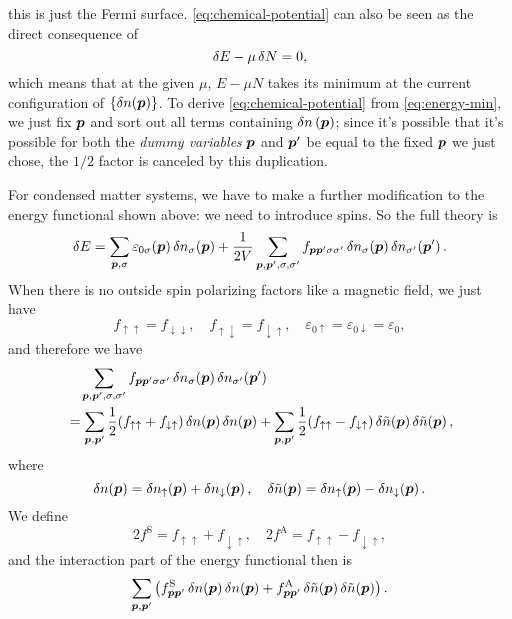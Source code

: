 \documentclass[hyperref, a4paper]{article}
\begin{document}
this is just the Fermi surface. 
\eqref{eq:chemical-potential} can also be seen as the direct consequence of 
\begin{equation}
    \var{E} - \mu \var{N} = 0,
    \label{eq:energy-min}
\end{equation}
which means that at the given $\mu$, 
$E - \mu N$ takes its minimum at the current configuration of $\{\var{n(\vb*{p})}\}$.
To derive \eqref{eq:chemical-potential} from \eqref{eq:energy-min}, 
we just fix $\vb*{p}$ and sort out all terms containing $\var{n}(\vb*{p})$;
since it's possible that it's possible 
for both the \emph{dummy variables} $\vb*{p}$ and $\vb*{p}'$ 
be equal to the fixed $\vb*{p}$ we just chose, 
the $1/2$ factor is canceled by this duplication.

For condensed matter systems, 
we have to make a further modification to the energy functional shown above: 
we need to introduce spins. 
So the full theory is 
\begin{equation}
    \var{E} = \sum_{\vb*{p}, \sigma} \varepsilon_{0 \sigma} (\vb*{p}) \var{n_\sigma(\vb*{p})}
    + \frac{1}{2V} \sum_{\vb*{p}, \vb*{p}', \sigma, \sigma'}
    f_{\vb*{p} \vb*{p}' \sigma \sigma'} \var{n_{\sigma}(\vb*{p})} \var{n_{\sigma'} (\vb*{p}')}.
\end{equation}
When there is no outside spin polarizing factors 
like a magnetic field, 
we just have 
\begin{equation}
    f_{\uparrow \uparrow} = f_{\downarrow \downarrow}, \quad 
    f_{\uparrow \downarrow} = f_{\downarrow \uparrow}, \quad 
    \varepsilon_{0 \uparrow} = \varepsilon_{0 \downarrow} = \varepsilon_0,
\end{equation}
and therefore we have 
\[
    \begin{aligned}
        &\quad \sum_{\vb*{p}, \vb*{p}', \sigma, \sigma'} 
        f_{\vb*{p} \vb*{p}' \sigma \sigma'} \var{n_{\sigma}(\vb*{p})} \var{n_{\sigma'} (\vb*{p}')} \\
        &= \sum_{\vb*{p}, \vb*{p}'} \frac{1}{2} (f_{\uparrow \uparrow} + f_{\downarrow \uparrow})
        \var{n(\vb*{p})} \var{{n}(\vb*{p})}
        + \sum_{\vb*{p}, \vb*{p}'} \frac{1}{2} (f_{\uparrow \uparrow} - f_{\downarrow \uparrow})
        \var{\tilde{n}(\vb*{p})} \var{\tilde{n}(\vb*{p})},
    \end{aligned}
\]
where 
\begin{equation}
    \var{n(\vb*{p})} = \var{n_\uparrow(\vb*{p})} + \var{n_\downarrow(\vb*{p})}, \quad 
    \var{\tilde{n}(\vb*{p})} = \var{n_\uparrow(\vb*{p})} - \var{n_\downarrow(\vb*{p})}.
\end{equation}
We define 
\begin{equation}
    2f^{\text{S}} = f_{\uparrow \uparrow} + f_{\downarrow \uparrow}, \quad 
    2f^{\text{A}} = f_{\uparrow \uparrow} - f_{\downarrow \uparrow}, 
\end{equation}
and the interaction part of the energy functional then is 
\begin{equation}
    \sum_{\vb*{p}, \vb*{p}'} \left(
        f^{\text{S}}_{\vb*{p} \vb*{p}'} \var{n(\vb*{p})} \var{{n}(\vb*{p})}
    + f^{\text{A}}_{\vb*{p} \vb*{p}'} \var{\tilde{n}(\vb*{p})} \var{\tilde{n}(\vb*{p})}
    \right).
\end{equation}
\end{document}
